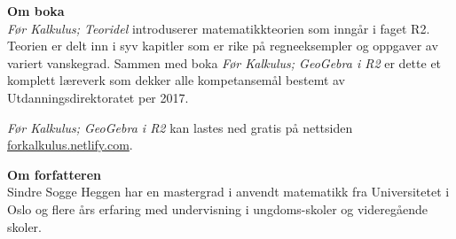 


\newpage
\pagecolor{blue!20}
\thispagestyle{empty}
\textbf{Om boka} \\
\textit{Før Kalkulus; Teoridel} introduserer matematikkteorien som inngår i faget R2. Teorien er delt inn i syv kapitler som er rike på regneeksempler og oppgaver av variert vanskegrad. Sammen med boka \textit{Før Kalkulus; GeoGebra i R2} er dette et komplett læreverk som dekker alle kompetansemål bestemt av Utdanningsdirektoratet per 2017.

\textit{Før Kalkulus; GeoGebra i R2} kan lastes ned gratis på nettsiden\\ \url{forkalkulus.netlify.com}. \vsk

\textbf{Om forfatteren} \\
Sindre Sogge Heggen har en mastergrad i anvendt matematikk fra Universitetet i Oslo og flere års erfaring med undervisning i ungdoms-skoler og videregående skoler.
